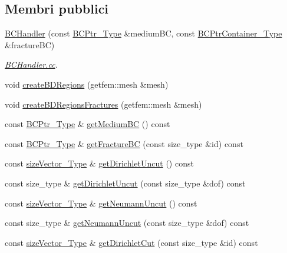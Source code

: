 \subsection*{Membri pubblici}
\begin{DoxyCompactItemize}
\item 
\hyperlink{classBCHandler_a35bb263a58e1bc9e0cfd34bf9cffac0d}{B\-C\-Handler} (const \hyperlink{BC_8h_a088c36f945ad8f6e7e0c7c423994c6ec}{B\-C\-Ptr\-\_\-\-Type} \&medium\-B\-C, const \hyperlink{BC_8h_ae127263052e0676d0fe233f834ca7227}{B\-C\-Ptr\-Container\-\_\-\-Type} \&fracture\-B\-C)
\begin{DoxyCompactList}\small\item\em \hyperlink{BCHandler_8cc}{B\-C\-Handler.\-cc}. \end{DoxyCompactList}\item 
void \hyperlink{classBCHandler_a1dcccdbb5e0eb0d044455414b52b2f05}{create\-B\-D\-Regions} (getfem\-::mesh \&mesh)
\item 
void \hyperlink{classBCHandler_a559e4ba01fc7c6326dbb949d06dbd525}{create\-B\-D\-Regions\-Fractures} (getfem\-::mesh \&mesh)
\item 
const \hyperlink{BC_8h_a088c36f945ad8f6e7e0c7c423994c6ec}{B\-C\-Ptr\-\_\-\-Type} \& \hyperlink{classBCHandler_ab7e56a166f8f51be96b2bf8946bf7b62}{get\-Medium\-B\-C} () const 
\item 
const \hyperlink{BC_8h_a088c36f945ad8f6e7e0c7c423994c6ec}{B\-C\-Ptr\-\_\-\-Type} \& \hyperlink{classBCHandler_a2ab65711f8ee3643ecf19de52ceab470}{get\-Fracture\-B\-C} (const size\-\_\-type \&id) const 
\item 
const \hyperlink{Core_8h_a83c51913d041a5001e8683434c09857f}{size\-Vector\-\_\-\-Type} \& \hyperlink{classBCHandler_a68a01c71517202ed89ebc82a56e4cb5d}{get\-Dirichlet\-Uncut} () const 
\item 
const size\-\_\-type \& \hyperlink{classBCHandler_a3f92a68c9b0dbebc6ee72a42b419645d}{get\-Dirichlet\-Uncut} (const size\-\_\-type \&dof) const 
\item 
const \hyperlink{Core_8h_a83c51913d041a5001e8683434c09857f}{size\-Vector\-\_\-\-Type} \& \hyperlink{classBCHandler_a5b1c86a6c303abf33850132d1bc12693}{get\-Neumann\-Uncut} () const 
\item 
const size\-\_\-type \& \hyperlink{classBCHandler_a2bf41619c541b124b421d8664786a055}{get\-Neumann\-Uncut} (const size\-\_\-type \&dof) const 
\item 
const \hyperlink{Core_8h_a83c51913d041a5001e8683434c09857f}{size\-Vector\-\_\-\-Type} \& \hyperlink{classBCHandler_a1efb6389dbecbcd38e53422ffc6f29c7}{get\-Dirichlet\-Cut} (const size\-\_\-type \&id) const 

\end{DoxyCompactItemize}

